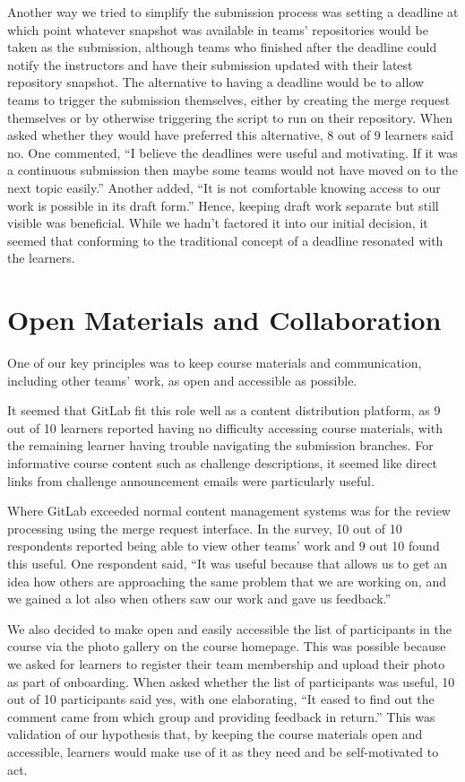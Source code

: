 \documentclass[12pt,twoside]{mitthesis}
\begin{document}
Another way we tried to simplify the submission process was setting a deadline at which point whatever snapshot was available in teams' repositories would be taken as the submission, although teams who finished after the deadline could notify the instructors and have their submission updated with their latest repository snapshot. The alternative to having a deadline would be to allow teams to trigger the submission themselves, either by creating the merge request themselves or by otherwise triggering the script to run on their repository. When asked whether they would have preferred this alternative, 8 out of 9 learners said no. One commented, ``I believe the deadlines were useful and motivating. If it was a continuous submission then maybe some teams would not have moved on to the next topic easily.'' Another added, ``It is not comfortable knowing access to our work is possible in its draft form.'' Hence, keeping draft work separate but still visible was beneficial. While we hadn't factored it into our initial decision, it seemed that conforming to the traditional concept of a deadline resonated with the learners.

\section{Open Materials and Collaboration}

One of our key principles was to keep course materials and communication, including other teams' work, as open and accessible as possible. 

It seemed that GitLab fit this role well as a content distribution platform, as 9 out of 10 learners reported having no difficulty accessing course materials, with the remaining learner having trouble navigating the submission branches. For informative course content such as challenge descriptions, it seemed like direct links from challenge announcement emails were particularly useful.

Where GitLab exceeded normal content management systems was for the review processing using the merge request interface. In the survey, 10 out of 10 respondents reported being able to view other teams' work and 9 out 10 found this useful. One respondent said, ``It was useful because that allows us to get an idea how others are approaching the same problem that we are working on, and we gained a lot also when others saw our work and gave us feedback.'' 

We also decided to make open and easily accessible the list of participants in the course via the photo gallery on the course homepage. This was possible because we asked for learners to register their team membership and upload their photo as part of onboarding. When asked whether the list of participants was useful, 10 out of 10 participants said yes, with one elaborating, ``It eased to find out the comment came from which group and providing feedback in return.'' This was validation of our hypothesis that, by keeping the course materials open and accessible, learners would make use of it as they need and be self-motivated to act.
\end{document}
